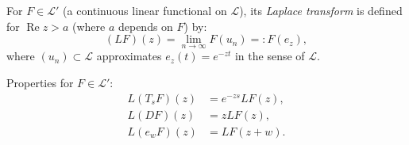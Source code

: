 For $F \in \mathcal{L}'$ (a continuous linear functional on $\mathcal{L}$), its \textit{Laplace transform} is defined for $\operatorname{Re} z > a$ (where $a$ depends on $F$) by:
\[
(LF)(z) = \lim_{n \to \infty} F(u_n) =: F(e_z),
\]
where $(u_n) \subset \mathcal{L}$ approximates $e_z(t) = e^{-zt}$ in the sense of $\mathcal{L}$.

Properties for $F \in \mathcal{L}'$:
\begin{align}
L(T_s F)(z) &= e^{-zs} LF(z), \\
L(DF)(z) &= z LF(z), \\
L(e_w F)(z) &= LF(z + w).
\end{align}
